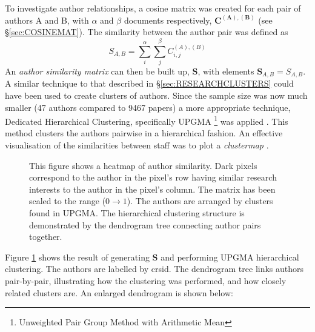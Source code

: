 To investigate author relationships, a cosine matrix was created for each pair of authors A and B, with $\alpha$ and $\beta$ documents respectively, $\mathbf{C^{\left( A \right ) , \left( B \right)}}$ (see \S\ref{sec:COSINEMAT}). The similarity between the author pair was defined as 
$$S_{A , B} = \sum_{i}^{\alpha} \sum_{j}^{\beta} C^{\left( A \right) , \left( B \right) }_{ i , j }$$
An \emph{author similarity matrix} can then be built up, $\mathbf{S}$, with elements $\mathbf{S}_{ A , B }=S_{ A , B }$.
A similar technique to that described in  \S\ref{sec:RESEARCHCLUSTERS} could have been used to create clusters of authors. Since the sample size was now much smaller (47 authors compared to 9467 papers) a more appropriate technique, Dedicated Hierarchical Clustering, specifically UPGMA \footnote{Unweighted Pair Group Method with Arithmetic Mean} was applied \cite{heatmapcluster}. This method clusters the authors pairwise in a hierarchical fashion.  An effective visualisation of the similarities between staff was to plot a \emph{clustermap} \cite{seaborn} \cite{scipy}.
\begin{center}
\begin{figure}[H]
  \centering
    \caption{This figure shows a heatmap of author similarity. Dark pixels correspond to the author in the pixel's row having similar research interests to the author in the pixel's column. The matrix has been scaled to the range ($0 \rightarrow 1$).  The authors are arranged by clusters found in UPGMA. The hierarchical clustering structure is demonstrated by the dendrogram tree connecting author pairs together.}
    \label{fig:AUTHORSIMS}

\end{figure} 
\end{center}
Figure \ref{fig:AUTHORSIMS} shows the result of generating $\textbf{S}$ and performing UPGMA hierarchical clustering. The authors are labelled by crsid. The dendrogram tree links authors pair-by-pair, illustrating how the clustering was performed, and how closely related clusters are. An enlarged dendrogram is shown below:
